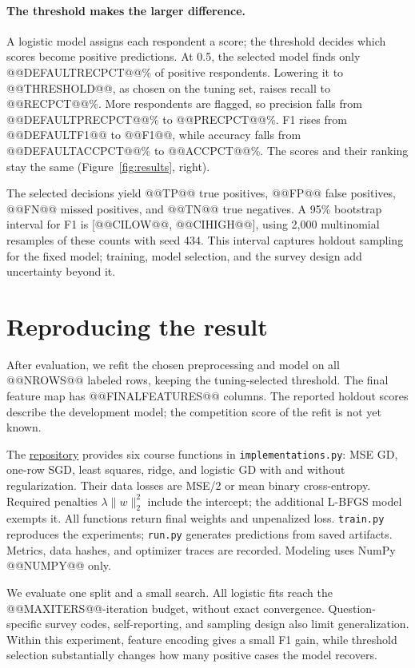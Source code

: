 \documentclass[10pt,a4paper]{article}
\begin{document}
\paragraph{The threshold makes the larger difference.}
A logistic model assigns each respondent a score; the threshold decides which scores become positive predictions. At 0.5, the selected model finds only @@DEFAULTRECPCT@@\% of positive respondents. Lowering it to @@THRESHOLD@@, as chosen on the tuning set, raises recall to @@RECPCT@@\%. More respondents are flagged, so precision falls from @@DEFAULTPRECPCT@@\% to @@PRECPCT@@\%. F1 rises from @@DEFAULTF1@@ to @@F1@@, while accuracy falls from @@DEFAULTACCPCT@@\% to @@ACCPCT@@\%. The scores and their ranking stay the same (Figure~\ref{fig:results}, right).

The selected decisions yield @@TP@@ true positives, @@FP@@ false positives, @@FN@@ missed positives, and @@TN@@ true negatives. A 95\% bootstrap interval for F1 is [@@CILOW@@, @@CIHIGH@@], using 2,000 multinomial resamples of these counts with seed 434. This interval captures holdout sampling for the fixed model; training, model selection, and the survey design add uncertainty beyond it.

\section{Reproducing the result}
After evaluation, we refit the chosen preprocessing and model on all @@NROWS@@ labeled rows, keeping the tuning-selected threshold. The final feature map has @@FINALFEATURES@@ columns. The reported holdout scores describe the development model; the competition score of the refit is not yet known.

The \href{https://github.com/MisakiTaro0414/epfl-ml-project1-2026}{repository} provides six course functions in \texttt{implementations.py}: MSE GD, one-row SGD, least squares, ridge, and logistic GD with and without regularization. Their data losses are MSE/2 or mean binary cross-entropy. Required penalties $\lambda\|w\|_2^2$ include the intercept; the additional L-BFGS model exempts it. All functions return final weights and unpenalized loss. \texttt{train.py} reproduces the experiments; \texttt{run.py} generates predictions from saved artifacts. Metrics, data hashes, and optimizer traces are recorded. Modeling uses NumPy @@NUMPY@@ only.

We evaluate one split and a small search. All logistic fits reach the @@MAXITERS@@-iteration budget, without exact convergence. Question-specific survey codes, self-reporting, and sampling design also limit generalization. Within this experiment, feature encoding gives a small F1 gain, while threshold selection substantially changes how many positive cases the model recovers.
\end{document}
